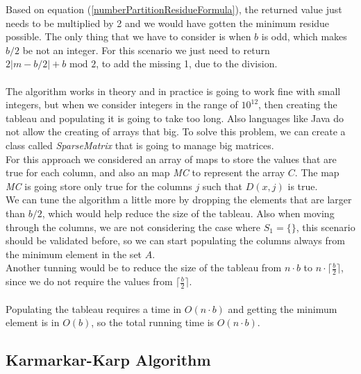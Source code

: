 \documentclass[tikz, 12pt]{scrartcl}
\begin{document}
Based on equation (\ref{numberPartitionResidueFormula}), the returned value  just needs to be multiplied by 2 and we would have gotten the minimum residue possible. The only thing that we have to consider is when $b$ is odd, which makes $b/2$ be not an integer. For this scenario we just need to return $2 |m - b / 2| + b \mbox{ mod } 2$, to add the missing 1, due to the division.\\
\\
The algorithm works in theory and in practice is going to work fine with small integers, but when we consider integers in the range of $10^{12}$, then creating the tableau and populating it is going to take too long. Also languages like Java do not allow the creating of arrays that big. To solve this problem, we can create a class called \textit{SparseMatrix} that is going to manage big matrices.\\
For this approach we considered an array of maps to store the values that are true for each column, and also an map \textit{MC} to represent the array $C$. The map \textit{MC} is going store only true for the columns $j$ such that $D(x,j)$ is true.\\
We can tune the algorithm a little more by dropping the elements that are larger than $b/2$, which would help reduce the size of the tableau. Also when moving through the columns, we are not considering the case where $S_1 = \{ \}$, this scenario should be validated before, so we can start populating the columns always from the minimum element in the set $A$.\\
Another tunning would be to reduce the size of the tableau from $n \cdot b$ to $n \cdot \lceil \frac{b}{2} \rceil$, since we do not require the values from $\lceil \frac{b}{2} \rceil$.\\
\\
Populating the tableau requires a time in $O(n \cdot b)$ and getting the minimum element is in $O(b)$, so the total running time is $O(n  \cdot b)$.

\subsection{Karmarkar-Karp Algorithm}
\end{document}
